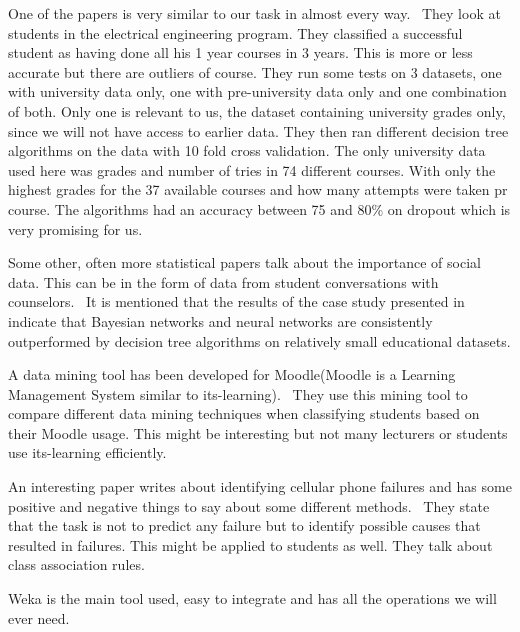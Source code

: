 \bigskip\noindent
One of the papers is very similar to our task in almost every way.~\cite{7} 
They look at students in the electrical engineering program. 
They classified a successful student as having done all his 1 year courses in 3 years. 
This is more or less accurate but there are outliers of course. 
They run some tests on 3 datasets, one with university data only, one with pre-university data only and one combination of both. 
Only one is relevant to us, the dataset containing university grades only, since we will not have access to earlier data. 
They then ran different decision tree algorithms on the data with 10 fold cross validation. 
The only university data used here was grades and number of tries in 74 different courses. 
With only the highest grades for the 37 available courses and how many attempts were taken pr course.
The algorithms had an accuracy between 75 and 80\% on dropout which is very promising for us.

\bigskip\noindent
Some other, often more statistical papers talk about the importance of social data. 
This can be in the form of data from student conversations with counselors.~\cite{11} 
It is mentioned that the results of the case study presented in~\cite{2} indicate that Bayesian networks and neural networks are consistently outperformed by decision tree algorithms on relatively small educational datasets.

\bigskip\noindent
A data mining tool has been developed for Moodle(Moodle is a Learning Management System similar to its-learning).~\cite{12} 
They use this mining tool to compare different data mining techniques when classifying students based on their Moodle usage. 
This might be interesting but not many lecturers or students use its-learning efficiently. 

\bigskip\noindent
An interesting paper writes about identifying cellular phone failures and has some positive and negative things to say about some different methods.~\cite{13} 
They state that the task is not to predict any failure but to identify possible causes that resulted in failures. 
This might be applied to students as well. They talk about class association rules.

\bigskip\noindent
Weka is the main tool used, easy to integrate and has all the operations we will ever need.

